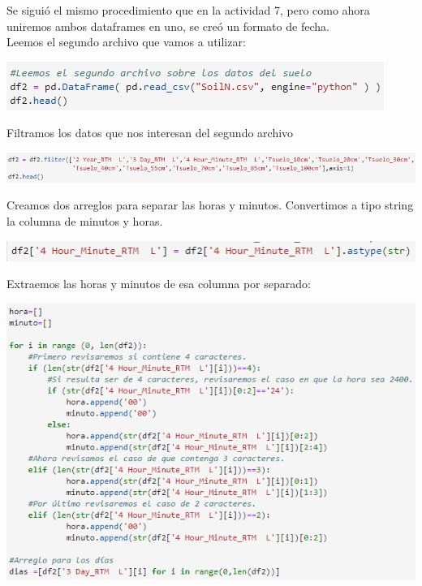 \documentclass{article}
\begin{document}
Se siguió el mismo procedimiento que en la actividad 7, pero como ahora uniremos ambos dataframes en uno, se creó un formato de fecha.
\\

Leemos el segundo archivo que vamos a utilizar:
\begin{center}
    \includegraphics[scale = 0.7]{read2.png}
\end{center}
\clearpage

Filtramos los datos que nos interesan del segundo archivo
\begin{center}
    \includegraphics[scale = 0.7]{filtrar.png}
\end{center}
Creamos dos arreglos para separar las horas y minutos. Convertimos a tipo string la columna de minutos y horas.

\begin{center}
    \includegraphics[scale = 0.7]{24h.png}
\end{center}
Extraemos las horas y minutos de esa columna por separado:
\begin{center}
    \includegraphics[scale = 0.7]{HrMin.png}
\end{center}
\end{document}
